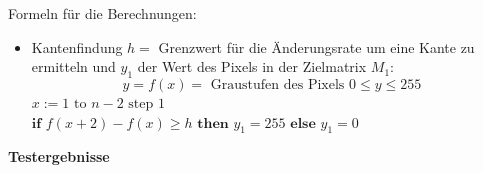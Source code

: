 Formeln für die Berechnungen:
\begin{itemize}
\item Kantenfindung $h=$ Grenzwert für die Änderungsrate um eine Kante zu ermitteln und $y_1$ der Wert des Pixels in der Zielmatrix $M_1$:
\[
y = f(x) = \text{ Graustufen des Pixels }0 \leq y \leq 255
\]
$x:=1 \text{ to } n-2 \text{ step } 1$\\ 
$\textbf{if } f(x+2)-f(x) \geq h \textbf{ then } y_1 = 255 \textbf{ else } y_1 = 0$\\
\end{itemize}
\textbf{Testergebnisse}\\